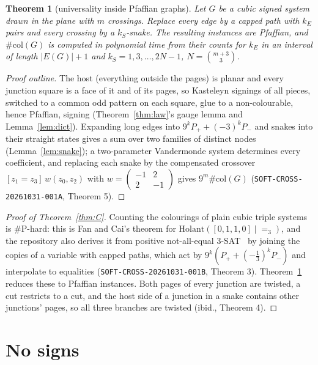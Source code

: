 \documentclass[11pt]{article}
\newtheorem{theorem}{Theorem}
\theoremstyle{definition}
\theoremstyle{remark}
\newcommand{\sharpP}{\#\mathrm{P}}
\newcommand{\col}{\#\mathrm{col}}
\begin{document}
\begin{theorem}[universality inside Pfaffian graphs]\label{thm:univ}
Let $G$ be a cubic signed system drawn in the plane with $m$ crossings. Replace
every edge by a capped path with $k_E$ pairs and every crossing by a
$k_S$-snake. The resulting instances are Pfaffian, and $\col(G)$ is computed
in polynomial time from their counts for $k_E$ in an interval of length
$|E(G)|+1$ and $k_S=1,3,\dots,2N-1$, $N=\binom{m+3}{3}$.
\end{theorem}
\begin{proof}[Proof outline]
The host (everything outside the pages) is planar and every junction square
is a face of it and of its pages, so Kasteleyn signings of all pieces,
switched to a common odd pattern on each square, glue to a non-colourable,
hence Pfaffian, signing (Theorem~\ref{thm:law}'s gauge lemma and
Lemma~\ref{lem:dict}). Expanding long edges into $9^kP_+ +(-3)^kP_-$ and snakes
into their straight states gives a sum over two families of distinct nodes
(Lemma~\ref{lem:snake}); a two-parameter Vandermonde system determines every
coefficient, and replacing each snake by the compensated crossover
$[z_1=z_3]\,w(z_0,z_2)$ with $w=\begin{pmatrix}-1&2\\2&-1\end{pmatrix}$ gives
$9^m\col(G)$ (\texttt{SOFT-CROSS-20261031-001A}, Theorem 5).
\end{proof}

\begin{proof}[Proof of Theorem~\ref{thm:C}]
Counting the colourings of plain cubic triple systems is $\sharpP$-hard: this
is Fan and Cai's theorem for $\mathrm{Holant}([0,1,1,0]\mid{=}_3)$, and the
repository also derives it from positive not-all-equal 3-SAT~\cite{CH96} by
joining the copies of a variable with capped paths, which act by
$9^k(P_++(-\tfrac13)^kP_-)$ and interpolate to equalities
(\texttt{SOFT-CROSS-20261031-001B}, Theorem 3). Theorem~\ref{thm:univ} reduces
these to Pfaffian instances. Both pages of every junction are twisted, a
cut restricts to a cut, and the host side of a junction in a snake contains
other junctions' pages, so all three branches are twisted
(ibid., Theorem 4).
\end{proof}

\section{No signs}\label{sec:plain}
\end{document}

